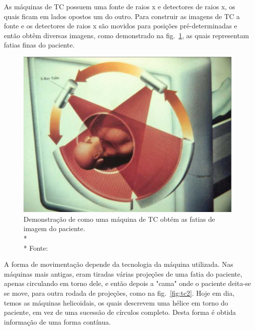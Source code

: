 As máquinas de TC possuem uma fonte de raios x e detectores de raios x, os quais ficam em lados opostos um do outro. Para construir as imagens de TC a fonte e os detectores de raios x são movidos para posições pré-determinadas e então obtêm diversas imagens, como demonstrado na fig.~\ref{fig:tc1}, as quais representam fatias finas do paciente.

\begin{figure}[ht]
 \begin{center}
  \includegraphics{imagens/tc.jpg}
 \end{center}
 \caption[Demonstração de como uma máquina de TC obtém as fatias de imagem do paciente.]{Demonstração de como uma máquina de TC obtém as fatias de imagem do paciente.\\* \\* Fonte: \citealt{sprawls}}
 \label{fig:tc1}
\end{figure}

A forma de movimentação depende da tecnologia da máquina utilizada. Nas máquinas mais antigas, eram tiradas várias projeções de uma fatia do paciente, apenas circulando em torno dele, e então depois a "cama" onde o paciente deita-se se move, para outra rodada de projeções, como na fig.~\ref{fig:tc2}. Hoje em dia, temos as máquinas helicoidais, os quais descrevem uma hélice em torno do paciente, em vez de uma sucessão de círculos completo. Desta forma é obtida informação de uma forma contínua.

